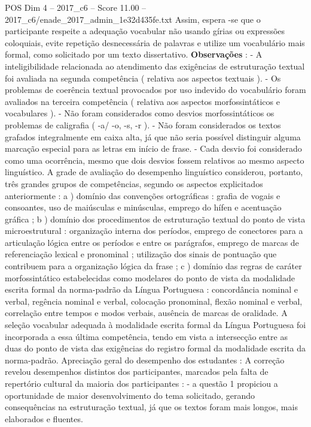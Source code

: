 \begin{textsample}{POS Dim 4 – 2017\_c6 – Score 11.00 – 2017\_c6/enade\_2017\_admin\_1e32d435fe.txt}
Assim, espera -se que o participante respeite a adequação vocabular não usando gírias ou expressões coloquiais, evite repetição desnecessária de palavras e utilize um vocabulário mais formal, como solicitado por um texto dissertativo. \textbf{Observações} : - A inteligibilidade relacionada ao atendimento das exigências de estruturação textual foi avaliada na segunda competência ( relativa aos aspectos textuais ). - Os problemas de coerência textual provocados por uso indevido do vocabulário foram avaliados na terceira competência ( relativa aos aspectos morfossintáticos e vocabulares ). - Não foram considerados como desvios morfossintáticos os problemas de caligrafia ( -a/ -o, -s, -r ). - Não foram considerados os textos grafados integralmente em caixa alta, já que não seria possível distinguir alguma marcação especial para as letras em início de frase. - Cada desvio foi considerado como uma ocorrência, mesmo que dois desvios fossem relativos ao mesmo aspecto linguístico.
A grade de avaliação do desempenho linguístico considerou, portanto, três grandes grupos de competências, segundo os aspectos explicitados anteriormente : a ) domínio das convenções ortográficas : grafia de vogais e consoantes, uso de maiúsculas e minúsculas, emprego do hífen e acentuação gráfica ; b ) domínio dos procedimentos de estruturação textual do ponto de vista microestrutural : organização interna dos períodos, emprego de conectores para a articulação lógica entre os períodos e entre os parágrafos, emprego de marcas de referenciação lexical e pronominal ; utilização dos sinais de pontuação que contribuem para a organização lógica da frase ; c ) domínio das regras de caráter morfossintático estabelecidas como modelares do ponto de vista da modalidade escrita formal da norma-padrão da Língua Portuguesa : concordância nominal e verbal, regência nominal e verbal, colocação pronominal, flexão nominal e verbal, correlação entre tempos e modos verbais, ausência de marcas de oralidade.
A seleção vocabular adequada à modalidade escrita formal da Língua Portuguesa foi incorporada a essa última competência, tendo em vista a intersecção entre as duas do ponto de vista das exigências do registro formal da modalidade escrita da norma-padrão.
Apreciação geral do desempenho dos estudantes : A correção revelou desempenhos distintos dos participantes, marcados pela falta de repertório cultural da maioria dos participantes : - a questão 1 propiciou a oportunidade de maior desenvolvimento do tema solicitado, gerando consequências na estruturação textual, já que os textos foram mais longos, mais elaborados e fluentes.

\end{textsample}
